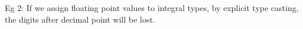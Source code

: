 \begin{flushleft}
\begin{itemize}
		\bigskip

		Eg 2: If we assign floating point values to integral types, by explicit type casting, the digits after decimal point will be lost.
		\bigskip
		
	\end{itemize}
	
\end{flushleft}

